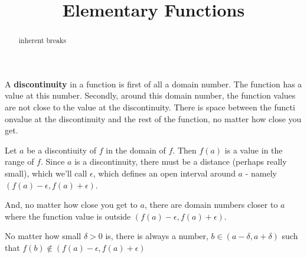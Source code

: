 \documentclass{ximera}
\title{Elementary Functions}
\begin{document}
\begin{abstract}
inherent breaks
\end{abstract}
\maketitle




A \textbf{discontinuity} in a function is first of all a domain number.  The function has a value at this number. Secondly, around this domain number, the function values are not close to the value at the discontinuity. There is space between the functi onvalue at the discontinuity and the rest of the function, no matter how close you get.


Let $a$ be a discontiuity of $f$ in the domain of $f$.   Then $f(a)$ is a value in the range of $f$. Since $a$ is a discontinuity, there must be a distance (perhaps really small), which we'll call $\epsilon$, which defines an open interval around $a$ - namely $(f(a)-\epsilon, f(a)+\epsilon)$.  

And, no matter how close you get to $a$, there are domain numbers closer to $a$ where the function value is outside $(f(a)-\epsilon, f(a)+\epsilon)$.


No matter how small $\delta>0$ is, there is always a number, $b \in (a-\delta, a+\delta)$ such that $ f(b) \not\in(f(a)-\epsilon, f(a)+\epsilon)$
\end{document}
